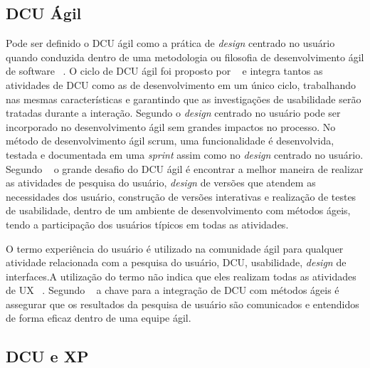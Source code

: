 \subsection{DCU Ágil}

Pode ser definido o DCU ágil como a prática de \emph{design} centrado no usuário quando conduzida dentro de uma metodologia ou filosofia de desenvolvimento ágil de software ~\cite{santos2012}.
%
O ciclo de DCU ágil foi proposto por ~ e integra tantos as atividades de DCU como as de desenvolvimento em um único ciclo, trabalhando nas mesmas características e garantindo que as investigações de usabilidade serão tratadas durante a interação.
%
Segundo  o \emph{design} centrado no usuário pode ser incorporado no desenvolvimento ágil sem grandes impactos no processo. No método de desenvolvimento ágil scrum, uma funcionalidade é desenvolvida, testada e documentada em uma \textit{sprint} assim como no \emph{design} centrado no usuário. 
%	
Segundo ~ o grande desafio do DCU ágil é encontrar a melhor maneira de realizar as atividades de pesquisa do usuário, \emph{design} de versões que atendem as necessidades dos usuário, construção de versões interativas e realização de testes de usabilidade, dentro de um ambiente de desenvolvimento com métodos ágeis, tendo a participação dos usuários típicos em todas as atividades.


O termo experiência do usuário é utilizado na comunidade ágil para qualquer atividade relacionada com a pesquisa do usuário, DCU, usabilidade, \emph{design} de interfaces.A utilização do termo não indica que eles realizam todas as atividades de UX ~\cite{santos2012}.
%
Segundo ~ a chave para a integração de DCU com métodos ágeis é assegurar que os resultados da pesquisa de usuário são comunicados e entendidos de forma eficaz dentro de uma equipe ágil.


\subsection {DCU e XP}

